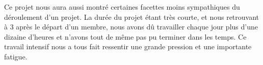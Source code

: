 \documentclass[11pt]{scrreprt}
\begin{document}
    Ce projet nous aura aussi montré certaines facettes moins sympathiques du déroulement d'un projet. La durée du projet étant très courte, et nous retrouvant à 3 après le départ d'un membre, nous avons dû travailler chaque jour plus d'une dizaine d'heures et n'avons tout de même pas pu terminer dans les temps. Ce travail intensif nous a tous fait ressentir une grande pression et une importante fatigue.
\end{document}
